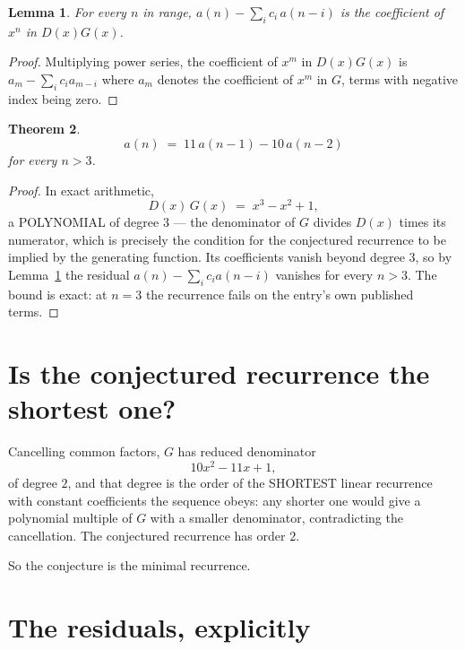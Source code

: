 \documentclass[11pt,a4paper]{article}
\theoremstyle{plain}
\newtheorem{theorem}{Theorem}
\newtheorem{lemma}[theorem]{Lemma}
\theoremstyle{definition}
\begin{document}
\begin{lemma}\label{lem:key}
For every $n$ in range, $a(n)-\sum_i c_i\,a(n-i)$ is the coefficient of $x^{n}$ in
$D(x)G(x)$.
\end{lemma}

\begin{proof}
Multiplying power series, the coefficient of $x^{m}$ in $D(x)G(x)$ is
$a_m-\sum_i c_i a_{m-i}$ where $a_m$ denotes the coefficient of $x^{m}$ in $G$, terms with
negative index being zero.
\end{proof}

\begin{theorem}
\[
a(n)\;=\;11\,a(n-1) - 10\,a(n-2)
\]
for every $n>3$.
\end{theorem}

\begin{proof}
In exact arithmetic,
\[
D(x)\,G(x)\;=\;x^{3} - x^{2} + 1,
\]
a POLYNOMIAL of degree $3$ --- the denominator of $G$ divides $D(x)$ times its numerator,
which is precisely the condition for the conjectured recurrence to be implied by the
generating function. Its coefficients vanish beyond degree $3$, so by
Lemma~\ref{lem:key} the residual $a(n)-\sum_ic_ia(n-i)$ vanishes for every
$n>3$. The bound is exact: at $n=3$ the recurrence fails on the entry's own published terms.
\end{proof}

\section{Is the conjectured recurrence the shortest one?}

Cancelling common factors, $G$ has reduced denominator
\[
10 x^{2} - 11 x + 1,
\]
of degree $2$, and that degree is the order of the SHORTEST linear recurrence with
constant coefficients the sequence obeys: any shorter one would give a polynomial multiple of
$G$ with a smaller denominator, contradicting the cancellation. The conjectured recurrence has
order $2$.

So the conjecture is the minimal recurrence.

\section{The residuals, explicitly}
\end{document}
